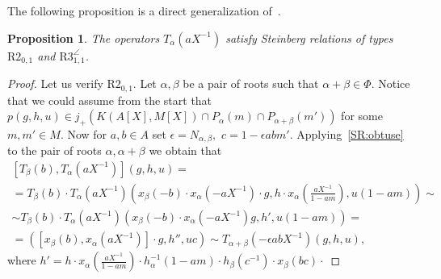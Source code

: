 \documentclass[oneside, 8pt]{amsart}
\newtheorem{prop}{Proposition}
\theoremstyle{remark}
\theoremstyle{definition}
\numberwithin{equation}{section}
\begin{document}
The following proposition is a direct generalization of~\cite[Proposition~4.3]{Tu83}.
\begin{prop} The operators $T_\alpha(aX^{-1})$ satisfy Steinberg relations of types $\text{R2}_{0,1}$ and $\text{R3}_{1,1}^{\angle}$. \end{prop}
\begin{proof} 
\begin{comment}
Suppose $(g, h, u)$ is such that $p(g, h, u) \in P_\alpha(m)$ for some $m \in M$.
Set $h' := x_\alpha\left(-\tfrac{aX^{-1}}{1+am}\right) \cdot h^{-1}_\alpha(1+am) \cdot x_\alpha\left(-bX^{-1}\left(1 + \tfrac{bm}{1+am}\right)^{-1}\right) =
  x_\alpha\left(- \tfrac{(a+b)X^{-1}}{1 + (a + b)m}\right) \cdot h^{-1}_\alpha(1+am).$
The assertion for $\text{R1}_1$ is obtained via~\cref{SR:additivity}:
\begin{multline} \nonumber T_\alpha(bX^{-1}) T_\alpha(aX^{-1}) \left(g,\ h,\ u\right) \sim \\ \sim
T_\alpha(bX^{-1}) \left(x_\alpha(aX^{-1})\cdot g,\ h \cdot x_\alpha\left(-\tfrac{aX^{-1}}{1 + am}\right) \cdot h^{-1}_\alpha(1 + am),\ u(1 + am)\right) = \\
 = \left( x_\alpha\left((a+b)X^{-1}\right)\cdot g,\ h \cdot h',\ u(1 + am + bm) \right) \sim T_\alpha((a+b)X^{-1}) \left( g,\ h,\ u\right), \end{multline} 
\end{comment}
Let us verify $\text{R2}_{0,1}$. Let $\alpha, \beta$ be a pair of roots such that $\alpha + \beta \in \Phi$.
Notice that we could assume from the start that $p(g, h, u) \in j_+(K(A[X], M[X]) \cap P_\alpha(m) \cap P_{\alpha + \beta}(m'))$ for some $m,m' \in M$.
Now for $a, b \in A$ set $\epsilon = N_{\alpha, \beta},$ $c = 1 - \epsilon abm'$.
Applying~\cref{SR:obtuse} to the pair of roots $\alpha, \alpha+\beta$ we obtain that 
\begin{multline} \nonumber
[T_\beta(b), T_\alpha(aX^{-1})] \left(g, h, u \right) = \\
 = T_\beta(b) \cdot T_\alpha(aX^{-1}) \left( x_\beta(-b) \cdot x_\alpha (-a X^{-1}) \cdot g, h \cdot x_\alpha\left(\tfrac{aX^{-1}}{1-am}\right), u (1 - am) \right) \sim \\
 \sim T_\beta(b) \cdot T_\alpha(aX^{-1}) \left( x_\beta(-b) \cdot x_\alpha (-a X^{-1}) g, h', u (1 - am) \right) = \\
 = \left([x_\beta(b), x_\alpha(aX^{-1})]\cdot g, h'', u c\right) \sim T_{\alpha+\beta}(-\epsilon abX^{-1})(g, h, u),\end{multline} 
 where $h' = h\cdot x_\alpha\left(\tfrac{a X^{-1}}{1-am}\right) \cdot h_{\alpha}^{-1}(1-am)\cdot h_{\beta}(c^{-1})\cdot x_{\beta}(bc)\cdot$ 

\end{proof}
\end{document}
